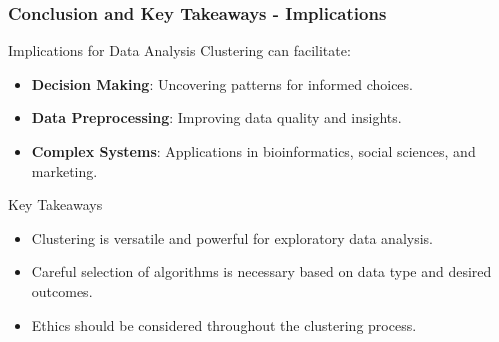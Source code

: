 \documentclass[aspectratio=169]{beamer}
\begin{document}
\begin{frame}[fragile]
  \frametitle{Conclusion and Key Takeaways - Implications}
  \begin{block}{Implications for Data Analysis}
    Clustering can facilitate:
    \begin{itemize}
      \item \textbf{Decision Making}: Uncovering patterns for informed choices.
      \item \textbf{Data Preprocessing}: Improving data quality and insights.
      \item \textbf{Complex Systems}: Applications in bioinformatics, social sciences, and marketing.
    \end{itemize}
  \end{block}

  \begin{block}{Key Takeaways}
    \begin{itemize}
      \item Clustering is versatile and powerful for exploratory data analysis.
      \item Careful selection of algorithms is necessary based on data type and desired outcomes.
      \item Ethics should be considered throughout the clustering process.
    \end{itemize}
  \end{block}
\end{frame}
\end{document}

